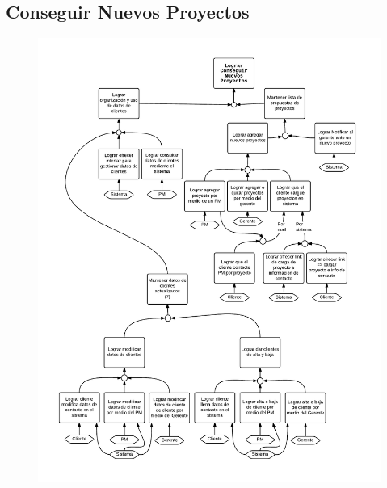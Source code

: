 \subsection{Conseguir Nuevos Proyectos}
\begin{figure}[H]
\includegraphics[width=\textwidth, clip=true, trim=15pt 0pt 15pt 0pt]{imagenes/objetivos/objetivos15.pdf}
\end{figure}
